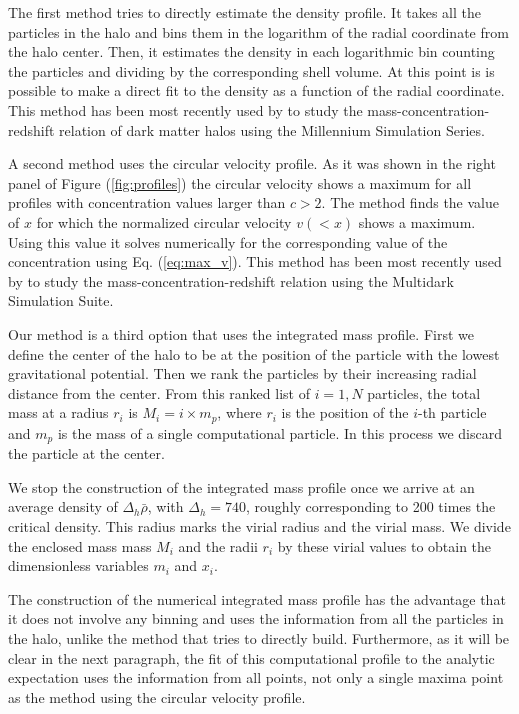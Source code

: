 \documentclass{emulateapj}
\begin{document}
The first method tries to directly estimate the density profile.
It takes all the particles in the halo and bins them in the logarithm
of the radial coordinate from the halo center.
Then, it estimates the density in each logarithmic bin counting the
particles and dividing by the corresponding shell volume.
At this point is is possible to make a direct fit to the density as a
function of the radial coordinate.
This method has been most recently used by \cite{Ludlow2014} to study
the mass-concentration-redshift relation of dark matter halos using
the Millennium Simulation Series.

A second method uses the circular velocity profile.
As it was shown in the right panel of Figure (\ref{fig:profiles}) the
circular velocity shows a maximum for all profiles with concentration
values larger than $c>2$.
The method finds the value of $x$ for which the normalized circular
velocity $v(<x)$ shows a maximum.
Using this value it solves numerically for the corresponding value of
the concentration using Eq. (\ref{eq:max_v}).
This method has been most recently used by \cite{Klypin2014} to study
the mass-concentration-redshift relation using the Multidark
Simulation Suite.

Our method is a third option that uses the integrated mass profile.
First we define the center of the halo to be at the position of the
particle with the lowest gravitational potential.
Then we rank the particles by their increasing radial distance from
the center.
From this ranked list of $i=1,N$ particles, the total mass at a radius
$r_i$ is $M_i=i\times m_p$, where $r_i$ is
the position of the $i$-th particle and $m_p$ is the mass of a single
computational particle.
In this process we discard the particle at the center.

We stop the construction of the integrated mass profile once we arrive
at an average density of $\Delta_h\bar{\rho}$, with $\Delta_h=740$,
roughly corresponding to 200 times the critical density.
This radius marks the virial radius and the virial mass.
We divide the enclosed mass mass $M_i$ and the radii $r_i$ by these
virial values to obtain the dimensionless variables $m_i$ and $x_i$.

The construction of the numerical integrated mass profile has the
advantage that it does not involve any binning and uses the
information from all the particles in the halo, unlike the method that
tries to directly build.
Furthermore, as it will be clear in the next paragraph, the fit of
this computational profile to the analytic expectation uses the
information from all points, not only a single maxima point as the
method using the circular velocity profile.
\end{document}
